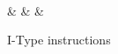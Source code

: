 \begin{figure}[h]
	\centering
	\begin{bytefield}[endianness=big,bitwidth=0.03\linewidth]{32}
		 \\
		 &
		 &
		 &
	\end{bytefield}

	\caption{I-Type instructions}
	\label{fig:itype_format}
\end{figure}
